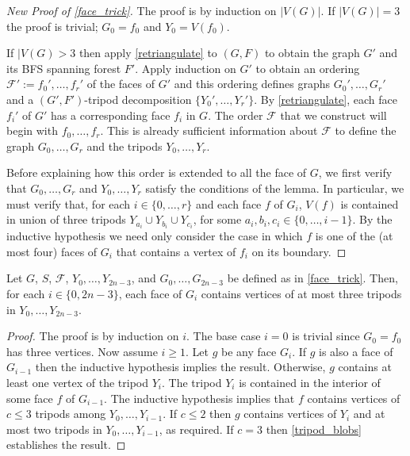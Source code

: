 \documentclass{patmorin}
\begin{document}
\begin{proof}[New Proof of \cref{face_trick}]
    The proof is by induction on $|V(G)|$.  If $|V(G)|=3$ the proof is trivial; $G_0=f_0$ and $Y_0=V(f_0)$.

    If $|V(G)> 3$ then apply \cref{retriangulate} to $(G,F)$ to obtain the graph $G'$ and its BFS spanning forest $F'$.  Apply induction on $G'$ to obtain an ordering $\mathcal{F}':=f_0',\ldots,f_{r}'$ of the faces of $G'$ and this ordering defines graphs $G_0',\ldots,G_r'$ and a $(G',F')$-tripod decomposition $\{Y_0',\ldots,Y_r'\}$.  By \cref{retriangulate}, each face $f_i'$ of $G'$ has a corresponding face $f_i$ in $G$.  The order $\mathcal{F}$ that we construct will begin with $f_0,\ldots,f_{r}$.  This is already sufficient information about $\mathcal{F}$ to define the graph $G_0,\ldots,G_r$ and the tripods $Y_0,\ldots,Y_r$.

    Before explaining how this order is extended to all the face of $G$, we first verify that $G_0,\ldots,G_r$ and $Y_0,\ldots,Y_r$ satisfy the conditions of the lemma.  In particular, we must verify that, for each $i\in\{0,\ldots,r\}$ and each face $f$ of $G_i$, $V(f)$ is contained in union of three tripods $Y_{a_i}\cup Y_{b_i}\cup Y_{c_i}$, for some $a_i,b_i,c_i\in\{0,\ldots,i-1\}$.  By the inductive hypothesis we need only consider the case in which $f$ is one of the (at most four) faces of $G_i$ that contains a vertex of $f_i$ on its boundary.






\end{proof}







\begin{lem}
  Let $G$, $S$, $\mathcal{F}$, $Y_0,\ldots,Y_{2n-3}$, and $G_0,\ldots,G_{2n-3}$ be defined as in \cref{face_trick}. Then, for each $i\in\{0,2n-3\}$, each face of $G_i$ contains vertices of at most three tripods in $Y_0,\ldots,Y_{2n-3}$.
\end{lem}

\begin{proof}
  The proof is by induction on $i$.  The base case $i=0$ is trivial since $G_0=f_0$ has three vertices.  Now assume $i\ge 1$. Let $g$ be any face $G_i$.  If $g$ is also a face of $G_{i-1}$ then the inductive hypothesis implies the result.  Otherwise, $g$ contains at least one vertex of the tripod $Y_i$.  The tripod $Y_i$ is contained in the interior of some face $f$ of $G_{i-1}$.  The inductive hypothesis implies that $f$ contains vertices of $c\le 3$ tripods among $Y_{0},\ldots,Y_{i-1}$.  If $c\le 2$ then $g$ contains vertices of $Y_i$ and at most two tripods in $Y_0,\ldots,Y_{i-1}$, as required.  If $c=3$ then \cref{tripod_blobs} establishes the result.
\end{proof}
\end{document}
